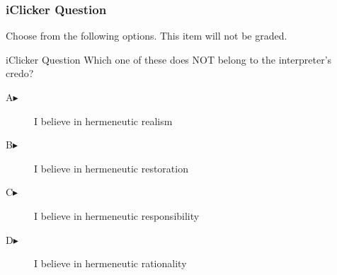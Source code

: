 \begin{frame}
  \frametitle{iClicker Question}
Choose from the following options. This item will not be graded.
\begin{block}{iClicker Question}
Which one of these does NOT belong to the interpreter's credo?
\end{block}
\begin{description}
\item[A\hspace{.2in}$\blacktriangleright$] I believe in hermeneutic realism
\item[B\hspace{.2in}$\blacktriangleright$] I believe in hermeneutic restoration
\item[C\hspace{.2in}$\blacktriangleright$] I believe in hermeneutic responsibility
\item[D\hspace{.2in}$\blacktriangleright$] I believe in hermeneutic rationality
\end{description}
\end{frame}

